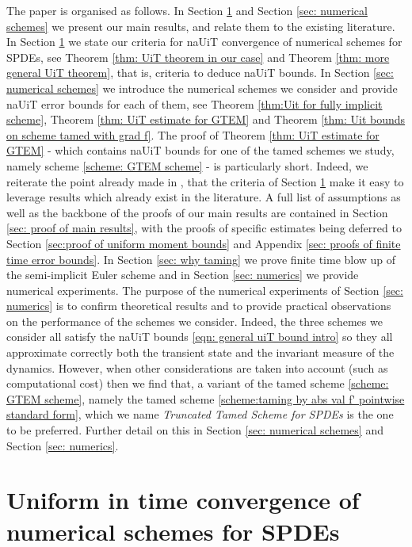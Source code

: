 \documentclass[reqno, 11pt]{amsart}
\theoremstyle{plain}
\theoremstyle{definition}
\theoremstyle{remark}
\numberwithin{equation}{section}
\numberwithin{theorem}{section}
\begin{document}
{The paper is organised as follows. In Section \ref{sec: sec2} and Section \ref{sec: numerical schemes}  we present our main results, and relate them to the existing literature. In Section \ref{sec: sec2} we state our criteria for naUiT convergence of numerical schemes for SPDEs, see Theorem \ref{thm: UiT theorem in our case} and Theorem \ref{thm: more general UiT theorem}, that is,  criteria to deduce naUiT bounds.  In Section \ref{sec: numerical schemes} we introduce the numerical schemes we consider and provide naUiT error bounds for each of them, see Theorem \ref{thm:Uit for fully implicit scheme}, Theorem \ref{thm: UiT estimate for GTEM} and Theorem \ref{thm: Uit bounds on scheme tamed with grad f}.  The proof of Theorem \ref{thm: UiT estimate for GTEM} - which contains naUiT bounds for one of the tamed schemes we study, namely  scheme \eqref{scheme: GTEM scheme} -  is particularly short. Indeed, we reiterate the point already made in \cite{schuh2024conditions}, that  the criteria of Section \ref{sec: sec2} make it easy to leverage  results which already exist in the literature.  A full list of assumptions as well as  the backbone of the proofs of our main results  are contained in Section \ref{sec: proof of main results}, with the proofs of specific estimates being deferred to Section \ref{sec:proof of uniform moment bounds} and Appendix \ref{sec: proofs of finite time error bounds}. In Section \ref{sec: why taming} we prove finite time blow up of the semi-implicit Euler scheme and in Section \ref{sec: numerics} we provide numerical experiments. The purpose of the numerical experiments of Section \ref{sec: numerics} is to  confirm theoretical results and to provide practical observations on the performance of the schemes we consider. Indeed, the three schemes we consider all satisfy the naUiT bounds \eqref{eqn: general uiT bound intro} so they all approximate correctly both the transient state and the invariant measure of the dynamics. However, when other considerations are taken into account (such as computational cost) then we find that,  a variant of the tamed scheme  \eqref{scheme: GTEM scheme}, namely the tamed scheme \eqref{scheme:taming by abs val f' pointwise standard form}, which we name {\em Truncated Tamed Scheme for SPDEs} is the one to be preferred. Further detail on this in Section \ref{sec: numerical schemes} and Section \ref{sec: numerics}. 






\section{Uniform in time convergence of numerical schemes for SPDEs}\label{sec: sec2}

}
\end{document}
